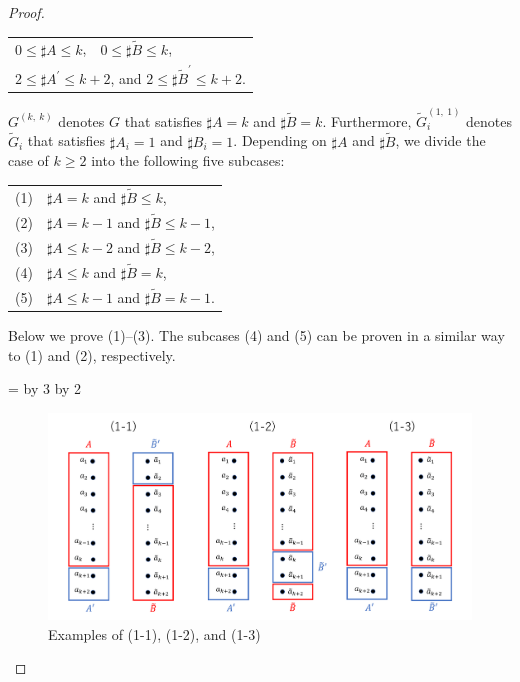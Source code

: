 \begin{proof}
\begin{tabular}{l}
$0 \le \sharp A \le k$,~~$0 \le \sharp\tilde{B} \le k$,\\
$2 \le \sharp A^{\prime} \le k+2$, and $2 \le \sharp \tilde{B}^{\prime} \le k+2$.
\end{tabular}

\noindent
$G^{(k,~k)}$ denotes $G$ that satisfies $\sharp A=k$ and $\sharp \tilde{B}=k$.
Furthermore, $\tilde{G}^{(1,~1)}_{i}$ denotes $\tilde{G}_{i}$ that satisfies $\sharp A_{i}=1$ and $\sharp B_{i}=1$.
%
Depending on $\sharp A$ and $\sharp \tilde{B}$, we divide the case of $k\ge 2$ into the following five subcases:
\smallskip

\begin{tabular}{ll}
\textrm{(1)} & $\sharp A=k$ and $\sharp \tilde{B} \le k$,\\
\textrm{(2)} & $\sharp A = k-1$ and $\sharp \tilde{B} \le k-1$,\\
\textrm{(3)} & $\sharp A \le k-2$ and $\sharp \tilde{B} \le k-2$,\\
\textrm{(4)} & $\sharp A \le k$ and $\sharp \tilde{B} = k$,\\
\textrm{(5)} & $\sharp A \le k - 1$ and $\sharp \tilde{B} = k - 1$.
\end{tabular}

\noindent
Below we prove (1)--(3). The subcases (4) and (5) can be proven in a similar way to (1) and (2), respectively.

\newdimen\mywidth
\mywidth=\textwidth
\divide\mywidth by 3
\multiply\mywidth by 2

\begin{figure}[t]
\centering
\includegraphics[width=\mywidth]{figs/ComparingBipartiteGraph.png}
\caption{Examples of (1-1), (1-2), and (1-3)}
\label{グラフ比較}
\end{figure}


\end{proof}
